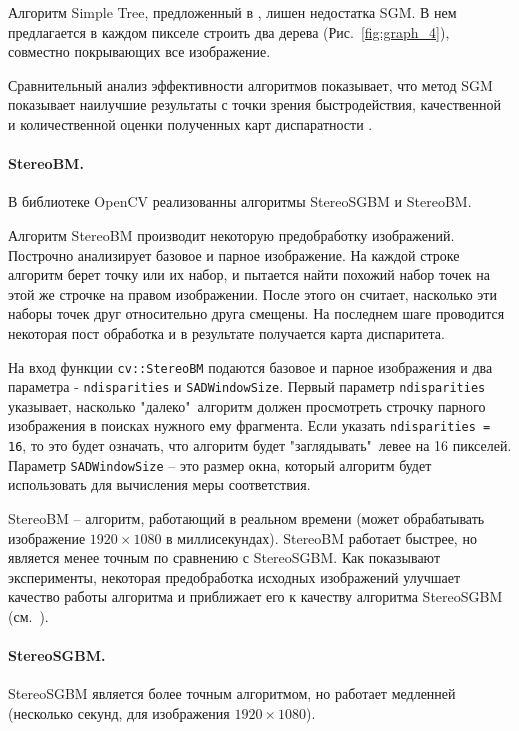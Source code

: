 \documentclass[oneside,final,12pt]{scrartcl}
\begin{document}
			Алгоритм Simple Tree, предложенный в \cite{Bleyer2008}, лишен недостатка SGM. В нем предлагается в каждом пикселе строить два дерева (Рис.~\ref{fig:graph_4}), совместно покрывающих все
			изображение.

			Сравнительный анализ эффективности алгоритмов показывает, что метод SGM показывает наилучшие результаты с точки зрения быстродействия, качественной и количественной оценки полученных карт диспаратности \cite{Ponomarev2013}.

			\paragraph{StereoBM.} В библиотеке OpenCV \cite{Bradski2000}	реализованны алгоритмы StereoSGBM и StereoBM.

			Алгоритм StereoBM производит некоторую предобработку изображений. Построчно анализирует базовое и парное изображение. На каждой строке алгоритм берет точку или их набор, и пытается найти похожий набор точек на этой же строчке на правом изображении. После этого он считает, насколько эти наборы точек друг относительно друга смещены. На последнем шаге проводится некоторая пост обработка и в результате получается карта диспаритета.

			На вход функции \texttt{cv::StereoBM} подаются базовое и парное изображения и два параметра -  \texttt{ndisparities} и \texttt{SADWindowSize}. Первый параметр \texttt{ndisparities} указывает, насколько "далеко"\ алгоритм должен просмотреть строчку парного изображения в поисках нужного ему фрагмента. Если указать \texttt{ndisparities = 16}, то это будет означать, что алгоритм будет "заглядывать"\ левее на 16 пикселей.
			Параметр \texttt{SADWindowSize} -- это размер окна, который алгоритм будет использовать для вычисления меры соответствия.

			StereoBM -- алгоритм, работающий в реальном времени (может обрабатывать изображение \(1920 \times 1080\) в миллисекундах). StereoBM работает  быстрее, но является менее точным по сравнению с StereoSGBM. Как показывают эксперименты, некоторая предобработка исходных изображений улучшает качество работы алгоритма и приближает его к качеству алгоритма StereoSGBM (см.~\cite{Parchami2014}).

			\paragraph{StereoSGBM.} StereoSGBM является более точным алгоритмом, но работает медленней (несколько секунд, для изображения \(1920 \times 1080\)).
\end{document}
